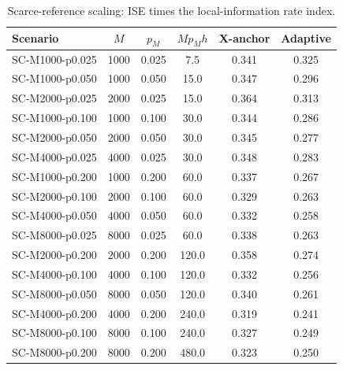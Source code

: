 \begin{table}[p]
\centering
\caption{Scarce-reference scaling: ISE times the local-information rate index.}
\label{tab:sim-scarcity}
\begin{tabular}{lccccc}
\toprule
Scenario & $M$ & $p_M$ & $Mp_Mh$ & X-anchor & Adaptive \\
\midrule
SC-M1000-p0.025 & 1000 & 0.025 & 7.5 & 0.341 & 0.325 \\
SC-M1000-p0.050 & 1000 & 0.050 & 15.0 & 0.347 & 0.296 \\
SC-M2000-p0.025 & 2000 & 0.025 & 15.0 & 0.364 & 0.313 \\
SC-M1000-p0.100 & 1000 & 0.100 & 30.0 & 0.344 & 0.286 \\
SC-M2000-p0.050 & 2000 & 0.050 & 30.0 & 0.345 & 0.277 \\
SC-M4000-p0.025 & 4000 & 0.025 & 30.0 & 0.348 & 0.283 \\
SC-M1000-p0.200 & 1000 & 0.200 & 60.0 & 0.337 & 0.267 \\
SC-M2000-p0.100 & 2000 & 0.100 & 60.0 & 0.329 & 0.263 \\
SC-M4000-p0.050 & 4000 & 0.050 & 60.0 & 0.332 & 0.258 \\
SC-M8000-p0.025 & 8000 & 0.025 & 60.0 & 0.338 & 0.263 \\
SC-M2000-p0.200 & 2000 & 0.200 & 120.0 & 0.358 & 0.274 \\
SC-M4000-p0.100 & 4000 & 0.100 & 120.0 & 0.332 & 0.256 \\
SC-M8000-p0.050 & 8000 & 0.050 & 120.0 & 0.340 & 0.261 \\
SC-M4000-p0.200 & 4000 & 0.200 & 240.0 & 0.319 & 0.241 \\
SC-M8000-p0.100 & 8000 & 0.100 & 240.0 & 0.327 & 0.249 \\
SC-M8000-p0.200 & 8000 & 0.200 & 480.0 & 0.323 & 0.250 \\
\bottomrule
\end{tabular}
\end{table}
